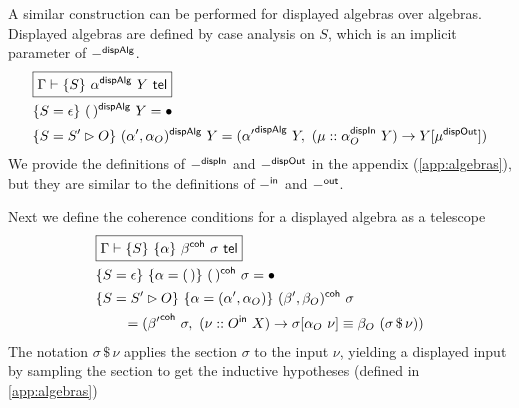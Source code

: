 
A similar construction can be performed for displayed algebras over algebras.
Displayed algebras are defined by case analysis on $S$, which is an implicit parameter of $-^{\textsf{dispAlg}}$.
\begin{align*}
&\boxed{\Gamma \vdash \{S\}\ \alpha\D\ Y \tel} \\
& \{S = \epsilon\}\ (\,)\D\ Y = \bullet \\
&\{S = S' \rhd O\}\ (\alpha', \alpha_O)\D\ Y = ({\alpha'}\D\ Y,\ (\mu :: \alpha_O\DI\ Y) \to Y[\mu\DO])
\end{align*}
We provide the definitions of $-^{\textsf{dispIn}}$ and $-^{\textsf{dispOut}}$ in the appendix (\cref{app:algebras}), but they are similar to
the definitions of $-^{\textsf{in}}$ and $-^{\textsf{out}}$.

Next we define the coherence conditions for a displayed algebra as a telescope
\begin{align*}
&\boxed{\Gamma \vdash \{S\}\ \{\alpha\}\ \beta^{\textsf{coh}}\ \sigma \ \textsf{tel}} \\
& \{S = \epsilon\}\ \{\alpha = (\,)\}\ (\,)^{\textsf{coh}}\ \sigma = \bullet \\
& \{S = S' \rhd O\}\ \{\alpha = (\alpha', \alpha_O)\}\ (\beta', \beta_O)^{\textsf{coh}}\ \sigma \\
&\qquad = ({\beta'}^{\textsf{coh}}\ \sigma,\ (\nu :: O^{\textsf{in}}\ X) \to \sigma[\alpha_O\ \nu] \equiv \beta_O\ (\sigma \, \$ \, \nu))
\end{align*}
The notation $\sigma \, \$\, \nu$ applies the section $\sigma$ to the input $\nu$,
yielding a displayed input by sampling the section to get the inductive
hypotheses (defined in \cref{app:algebras})

